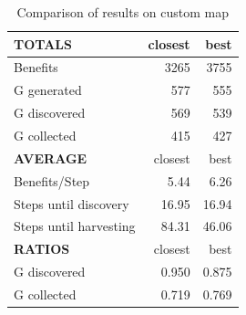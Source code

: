 \begin{table}[!hbt]
	\centering
    \begin{tabular}{ l | r | r }
        \hline
        \textbf{TOTALS} & closest & best \\
		\hline
        Benefits & 3265 & 3755 \\
        G generated & 577 & 555 \\
        G discovered & 569 & 539 \\
        G collected & 415 & 427 \\
        \hline \hline
        \textbf{AVERAGE} & closest & best \\
		\hline
        Benefits/Step & 5.44 & 6.26 \\
        Steps until discovery & 16.95 & 16.94 \\
        Steps until harvesting & 84.31 & 46.06 \\
        \hline \hline
        \textbf{RATIOS} & closest & best \\
		\hline
        G discovered & 0.950 & 0.875 \\
        G collected & 0.719 & 0.769 \\
    \end{tabular}
    \caption{Comparison of results on custom map}
    \label{tab:custom}
\end{table}


